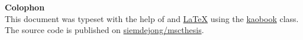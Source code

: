 \mbox{}
\vfill
\textbf{Colophon} \\
This document was typeset with the help of \href{https://sourceforge.net/projects/koma-script/}{\KOMAScript} and \href{https://www.latex-project.org/}{\LaTeX} using the \href{https://github.com/fmarotta/kaobook/}{kaobook} class.
The source code is published on \href{https://github.com/siemdejong/mscthesis}{ siemdejong/mscthesis}.

